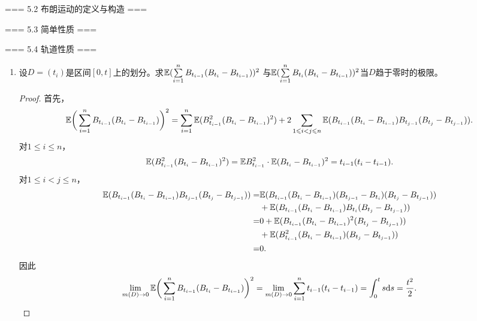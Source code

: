 === 5.2 布朗运动的定义与构造 ===

=== 5.3 简单性质 ===

=== 5.4 轨道性质 ===
\begin{enumerate}
    \item[5.4.3] 设$D=(t_i)$是区间$[0,t]$上的划分。求$\mathbb{E}(\sum\limits_{i=1}^nB_{t_{i-1}}(B_{t_i}-B_{t_{i-1}}))^2$
    与$\mathbb{E}(\sum\limits_{i=1}^nB_{t_i}(B_{t_i}-B_{t_{i-1}}))^2$当$D$趋于零时的极限。
    \begin{proof}
        首先，\[\mathbb{E}\bigg(\sum_{i=1}^nB_{t_{i-1}}(B_{t_i}-B_{t_{i-1}})\bigg)^2=
        \sum_{i=1}^n\mathbb{E}(B_{t_{i-1}}^2(B_{t_i}-B_{t_{i-1}})^2)+
        2\sum_{1\leqslant i<j\leqslant n}\mathbb{E}(B_{t_{i-1}}(B_{t_i}-B_{t_{i-1}})B_{t_{j-1}}(B_{t_j}-B_{t_{j-1}})).\]
        对$1\leqslant i\leqslant n$，\[\mathbb{E}(B_{t_{i-1}}^2(B_{t_i}-B_{t_{i-1}})^2)=
        \mathbb{E} B_{t_{i-1}}^2\cdot\mathbb{E}(B_{t_i}-B_{t_{i-1}})^2=t_{i-1}(t_i-t_{i-1}).\]
        对$1\leqslant i<j\leqslant n$，
        \begin{align*}
            \mathbb{E}(B_{t_{i-1}}(B_{t_i}-B_{t_{i-1}})B_{t_{j-1}}(B_{t_j}-B_{t_{j-1}}))=&\mathbb{E}(B_{t_{i-1}}(B_{t_i}-B_{t_{i-1}})(B_{t_{j-1}}-B_{t_i})(B_{t_j}-B_{t_{j-1}}))\\
            &+\mathbb{E}(B_{t_{i-1}}(B_{t_i}-B_{t_{i-1}})B_{t_i}(B_{t_j}-B_{t_{j-1}}))\\
            =&0+\mathbb{E}(B_{t_{i-1}}(B_{t_i}-B_{t_{i-1}})^2(B_{t_j}-B_{t_{j-1}}))\\
            &+\mathbb{E}(B_{t_{i-1}}^2(B_{t_i}-B_{t_{i-1}})(B_{t_j}-B_{t_{j-1}}))\\
            =&0.
        \end{align*}
        因此\[\lim_{m(D)\to0}\mathbb{E}\bigg(\sum_{i=1}^nB_{t_{i-1}}(B_{t_i}-B_{t_{i-1}})\bigg)^2=
        \lim_{m(D)\to0}\sum_{i=1}^nt_{i-1}(t_i-t_{i-1})=\int_0^ts{\rm d}s=\frac{t^2}{2}.\]


\end{proof}
\end{enumerate}
